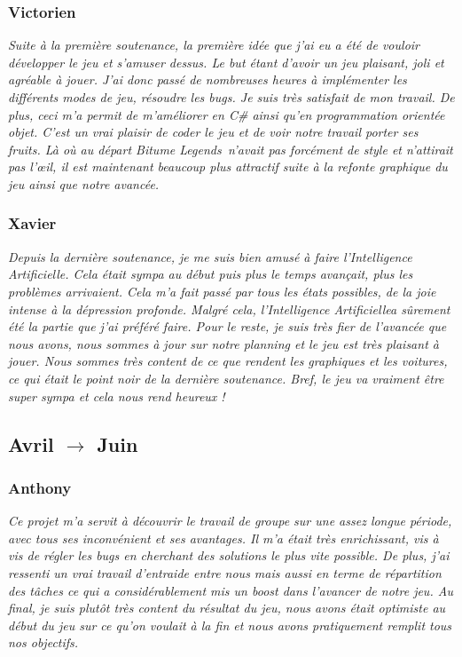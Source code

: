 \documentclass[a4paper,12pt]{article}
\newcommand{\btmlgs}{\textsl{Bitume Legends}}
\newcommand{\AI}{Intelligence Artificielle}
\begin{document}
            \subsubsection{Victorien}
                \textit{Suite à la première soutenance, la première idée que j'ai eu a été
                de vouloir développer le jeu et s'amuser dessus. Le but étant
                d'avoir un jeu plaisant, joli et agréable à jouer. J'ai donc passé
                de nombreuses heures à implémenter les différents modes de jeu, résoudre les 
                \textsl{bugs}. 
                Je suis très satisfait de mon travail. De plus, ceci m'a permit de m'améliorer en 
                \textsl{C\#} ainsi qu'en programmation orientée objet. C'est un vrai plaisir de coder 
                le jeu et de voir notre travail
                porter ses fruits. Là où au départ \btmlgs\, n'avait pas forcément de style et
                n'attirait pas l'œil, il est maintenant beaucoup plus attractif suite à
                la refonte graphique du jeu ainsi que notre avancée.}

            \subsubsection{Xavier}
                \textit{Depuis la dernière soutenance, je me suis bien amusé à faire l'\AI.
                Cela était sympa au début puis plus le temps avançait, plus les problèmes arrivaient.
                Cela m'a fait passé par tous les états possibles, de la joie intense à la dépression
                profonde. Malgré cela, l'\AI a sûrement été la partie que j'ai préféré faire.
                Pour le reste, je suis très fier de l'avancée que nous avons, nous sommes à jour sur 
                notre planning et le jeu est très plaisant à jouer. Nous sommes très content de ce que 
                rendent les graphiques et les voitures, ce qui était le point noir de la dernière 
                soutenance. Bref, le jeu va vraiment être super sympa et cela nous rend heureux ! }
                
     \subsection{Avril $\to$ Juin}
         \subsubsection{Anthony}
         \textit{Ce projet m'a servit à découvrir le travail de groupe sur une assez longue période, avec tous ses inconvénient et ses avantages. Il m'a était très enrichissant, vis à vis de régler les bugs en cherchant des solutions le plus vite possible. De plus, j'ai ressenti un vrai travail d'entraide entre nous mais aussi en terme de répartition des tâches ce qui a considérablement mis un boost dans l'avancer de notre jeu. Au final, je suis plutôt très content du résultat du jeu, nous avons était optimiste au début du jeu sur ce qu'on voulait à la fin et nous avons pratiquement remplit tous nos objectifs. }
             
\end{document}
